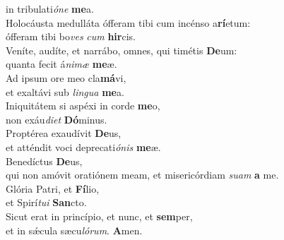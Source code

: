 \oddverse in tribulati\textit{ó}\textit{ne} \textbf{me}a.\\
\evenverse Holocáusta medulláta ófferam tibi cum incénso a\textbf{rí}etum:~\*\\
\evenverse ófferam tibi bo\textit{ves} \textit{cum} \textbf{hir}cis.\\
\oddverse Veníte, audíte, et narrábo, omnes, qui timétis \textbf{De}um:~\*\\
\oddverse quanta fecit á\textit{ni}\textit{mæ} \textbf{me}æ.\\
\evenverse Ad ipsum ore meo cla\textbf{má}vi,~\*\\
\evenverse et exaltávi sub \textit{lin}\textit{gua} \textbf{me}a.\\
\oddverse Iniquitátem si aspéxi in corde \textbf{me}o,~\*\\
\oddverse non exáu\textit{di}\textit{et} \textbf{Dó}minus.\\
\evenverse Proptérea exaudívit \textbf{De}us,~\*\\
\evenverse et atténdit voci deprecati\textit{ó}\textit{nis} \textbf{me}æ.\\
\oddverse Benedíctus \textbf{De}us,~\*\\
\oddverse qui non amóvit oratiónem meam, et misericórdiam \textit{su}\textit{am} \textbf{a} me.\\
\evenverse Glória Patri, et \textbf{Fí}lio,~\*\\
\evenverse et Spirí\textit{tu}\textit{i} \textbf{San}cto.\\
\oddverse Sicut erat in princípio, et nunc, et \textbf{sem}per,~\*\\
\oddverse et in sǽcula sæcu\textit{ló}\textit{rum}. \textbf{A}men.\\
